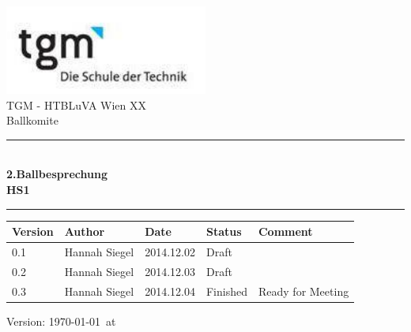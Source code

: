 \documentclass[12pt]{article}
\author{RoboNav}
\date{\today}
\begin{document}
\begin{titlepage}
\begin{center}

\includegraphics[width=0.5\textwidth]{logo}\\  

\LARGE TGM - HTBLuVA Wien XX \\ Ballkomite  \\[1.5cm]

\rule{1.0\textwidth}{1mm}
{ \huge \bfseries \\[0.4cm]  \huge 2.Ballbesprechung \\ \LARGE HS1 \\[0.4cm] }

\rule{1.0\textwidth}{1mm}



\noindent 
\vspace{6cm}
\small
\begin{center}
  \begin{tabular}{ | p{} | p{} | p{} | p{} | p{} |}
    \hline
\textbf{Version} & \textbf{Author} & \textbf{Date} & \textbf{Status} & \textbf{Comment} \\ 
    \hline 
    \hline
0.1 & Hannah Siegel & 2014.12.02 & Draft &    \\ 
0.2 & Hannah Siegel & 2014.12.03 & Draft &    \\ 
0.3 & Hannah Siegel & 2014.12.04 & Finished & Ready for Meeting    \\ 

    \hline
  \end{tabular}
\end{center}

\vfill

{\small Version: \today ~at  \thistime    }
\end{center}

\end{titlepage}
\tableofcontents
\end{document}
